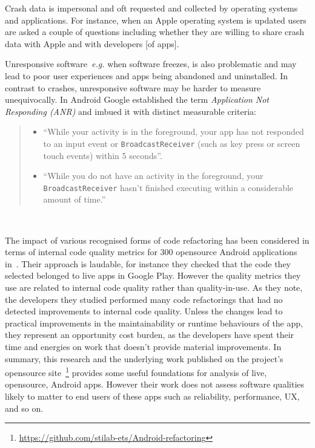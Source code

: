 
Crash data is impersonal and oft requested and collected by operating systems and applications. For instance, when an Apple operating system is updated users are asked a couple of questions including whether they are willing to share crash data with Apple and with developers [of apps].

Unresponsive software~\emph{e.g.} when software freezes, is also problematic and may lead to poor user experiences and apps being abandoned and uninstalled. In contrast to crashes, unresponsive software may be harder to measure unequivocally. In Android Google established the term \emph{Application Not Responding (ANR)} and imbued it with distinct measurable criteria: 

\begin{quote}
\begin{itemize}
    \item ``While your activity is in the foreground, your app has not responded to an input event or \texttt{BroadcastReceiver} (such as key press or screen touch events) within 5 seconds''.
    \item ``While you do not have an activity in the foreground, your \texttt{BroadcastReceiver} hasn't finished executing within a considerable amount of time.''
\end{itemize}    
\end{quote}~\citet{android_vitals_performance_anrs}




The impact of various recognised forms of code refactoring has been considered in terms of internal code quality metrics for 300 opensource Android applications in~\citep{Hamdi2021empirical}. Their approach is laudable, for instance they checked that the code they selected belonged to live apps in Google Play. However the quality metrics they use are related to internal code quality rather than quality-in-use. As they note, the developers they studied performed many code refactorings that had no detected improvements to internal code quality. Unless the changes lead to practical improvements in the maintainability or runtime behaviours of the app, they represent an opportunity cost burden, as the developers have spent their time and energies on work that doesn't provide material improvements. In summary, this research and the underlying work published on the project's opensource site~\footnote{\url{https://github.com/stilab-ets/Android-refactoring}} provides some useful foundations for analysis of live, opensource, Android apps. However their work does not assess software qualities likely to matter to end users of these apps such as reliability, performance, UX, and so on.


